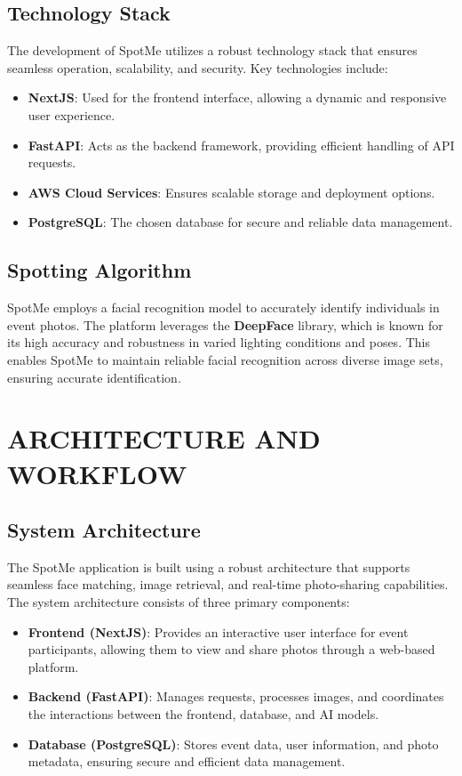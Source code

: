 \documentclass[12pt,a4paper]{report}
\begin{document}
\section{Technology Stack}
The development of SpotMe utilizes a robust technology stack that ensures seamless operation, scalability, and security. Key technologies include:
\begin{itemize}
    \item \textbf{NextJS}: Used for the frontend interface, allowing a dynamic and responsive user experience.
    \item \textbf{FastAPI}: Acts as the backend framework, providing efficient handling of API requests.
    \item \textbf{AWS Cloud Services}: Ensures scalable storage and deployment options.
    \item \textbf{PostgreSQL}: The chosen database for secure and reliable data management.
\end{itemize}

\section{Spotting Algorithm}
SpotMe employs a facial recognition model to accurately identify individuals in event photos. The platform leverages the \textbf{DeepFace} library, which is known for its high accuracy and robustness in varied lighting conditions and poses. This enables SpotMe to maintain reliable facial recognition across diverse image sets, ensuring accurate identification.

\chapter{ARCHITECTURE AND WORKFLOW}

\section{System Architecture}
The SpotMe application is built using a robust architecture that supports seamless face matching, image retrieval, and real-time photo-sharing capabilities. The system architecture consists of three primary components:
\begin{itemize}
    \item \textbf{Frontend (NextJS)}: Provides an interactive user interface for event participants, allowing them to view and share photos through a web-based platform.
    \item \textbf{Backend (FastAPI)}: Manages requests, processes images, and coordinates the interactions between the frontend, database, and AI models.
    \item \textbf{Database (PostgreSQL)}: Stores event data, user information, and photo metadata, ensuring secure and efficient data management.
\end{itemize}
\end{document}
